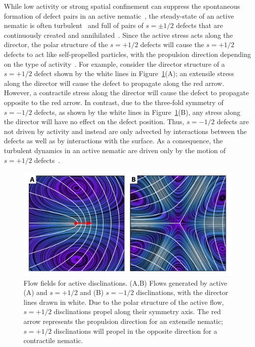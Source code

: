 While low activity or strong spatial confinement can suppress the spontaneous formation of defect pairs in an active nematic~\cite{RN9,RN247,RN7}, the steady-state of an active nematic is often turbulent~\cite{RN7} and full of pairs of $s = \pm 1/2$ defects that are continuously created and annihilated~\cite{RN11,RN8,RN3,RN27,RN135,RN86}.
Since the active stress acts along the director, the polar structure of the $s = +1/2$ defects will cause the $s = +1/2$ defects to act like self-propelled particles, with the propulsion direction depending on the type of activity~\cite{RN11,RN8}.
For example, consider the director structure of a $s = +1/2$ defect shown by the white lines in Figure~\ref{f:3-DefectFlow}(A); an extensile stress along the director will cause the defect to propagate along the red arrow.
However, a contractile stress along the director will cause the defect to propagate opposite to the red arrow.
In contrast, due to the three-fold symmetry of $s = -1/2$ defects, as shown by the white lines in Figure~\ref{f:3-DefectFlow}(B), any stress along the director will have no effect on the defect position.
Thus, $s = -1/2$ defects are not driven by activity and instead are only advected by interactions between the defects as well as by interactions with the surface.
As a consequence, the turbulent dynamics in an active nematic are driven only by the motion of $s = +1/2$ defects~\cite{RN7}.
\begin{figure}
  \centering
  \includegraphics{figures/C3/Ch3-Figs_DefectFlow.png}
  \caption{Flow fields for active disclinations.
  (A,B) Flows generated by active (A) and $s=+1/2$ and (B) $s=-1/2$ disclinations, with the director lines drawn in white.
  Due to the polar structure of the active flow, $s = +1/2$ disclinations propel along their symmetry axis.
  The red arrow represents the propulsion direction for an extensile nematic; $s = +1/2$ disclinations will propel in the opposite direction for a contractile nematic.}\label{f:3-DefectFlow}
\end{figure}

